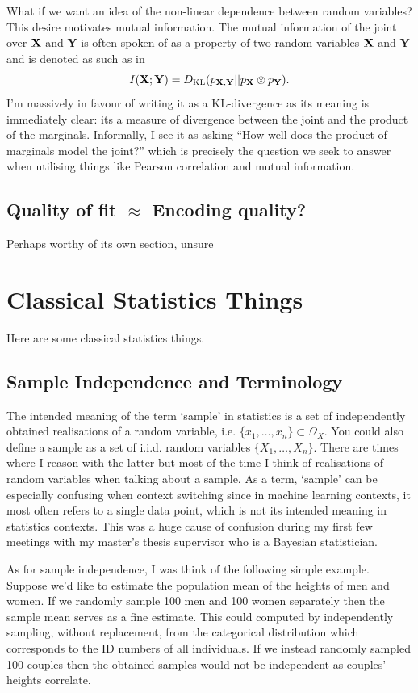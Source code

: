 \documentclass[11pt]{article}
\begin{document}
\begin{appendices}
What if we want an idea of the non-linear dependence between random variables? This desire motivates mutual information. The mutual information of the joint over $\mathbf{X}$ and $\mathbf{Y}$ is often spoken of as a property of two random variables $\mathbf{X}$ and $\mathbf{Y}$ and is denoted as such as in
$$
I(\mathbf{X};\mathbf{Y})
=
D_{\text{KL}}(p_{\mathbf{X},\mathbf{Y}}||p_{\mathbf{X}}\otimes p_{\mathbf{Y}}).
$$
I'm massively in favour of writing it as a KL-divergence as its meaning is immediately clear: its a measure of divergence between the joint and the product of the marginals. Informally, I see it as asking ``How well does the product of marginals model the joint?'' which is precisely the question we seek to answer when utilising things like Pearson correlation and mutual information.

\subsection{Quality of fit $\approx$ Encoding quality?}
\TODO Perhaps worthy of its own section, unsure

\section{Classical Statistics Things}
Here are some classical statistics things.

\subsection{Sample Independence and Terminology}
The intended meaning of the term `sample' in statistics is a set of independently obtained realisations of a random variable, i.e. $\{x_1,\dots,x_n\}\subset\Omega_X$. You could also define a sample as a set of i.i.d. random variables $\{X_1,\dots,X_n\}$. There are times where I reason with the latter but most of the time I think of realisations of random variables when talking about a sample. As a term, `sample' can be especially confusing when context switching since in machine learning contexts, it most often refers to a single data point, which is not its intended meaning in statistics contexts. This was a huge cause of confusion during my first few meetings with my master's thesis supervisor who is a Bayesian statistician.

As for sample independence, I was think of the following simple example. Suppose we'd like to estimate the population mean of the heights of men and women. If we randomly sample 100 men and 100 women separately then the sample mean serves as a fine estimate. This could computed by independently sampling, without replacement, from the categorical distribution which corresponds to the ID numbers of all individuals. If we instead randomly sampled 100 couples then the obtained samples would not be independent as couples' heights correlate.


\end{appendices}
\end{document}
